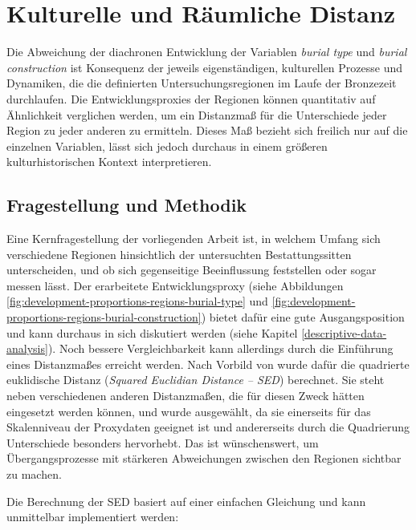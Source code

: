 \documentclass[openany,twoside,twocolumn]{book}
\begin{document}
\hypertarget{cultural-and-spatial-distance}{%
\section{Kulturelle und Räumliche
Distanz}\label{cultural-and-spatial-distance}}

Die Abweichung der diachronen Entwicklung der Variablen \emph{burial
type} und \emph{burial construction} ist Konsequenz der jeweils
eigenständigen, kulturellen Prozesse und Dynamiken, die die definierten
Untersuchungsregionen im Laufe der Bronzezeit durchlaufen. Die
Entwicklungsproxies der Regionen können quantitativ auf Ähnlichkeit
verglichen werden, um ein Distanzmaß für die Unterschiede jeder Region
zu jeder anderen zu ermitteln. Dieses Maß bezieht sich freilich nur auf
die einzelnen Variablen, lässt sich jedoch durchaus in einem größeren
kulturhistorischen Kontext interpretieren.

\hypertarget{fragestellung-und-methodik}{%
\subsection{Fragestellung und
Methodik}\label{fragestellung-und-methodik}}

Eine Kernfragestellung der vorliegenden Arbeit ist, in welchem Umfang
sich verschiedene Regionen hinsichtlich der untersuchten
Bestattungssitten unterscheiden, und ob sich gegenseitige Beeinflussung
feststellen oder sogar messen lässt. Der erarbeitete Entwicklungsproxy
(siehe Abbildungen \ref{fig:development-proportions-regions-burial-type}
und \ref{fig:development-proportions-regions-burial-construction})
bietet dafür eine gute Ausgangsposition und kann durchaus in sich
diskutiert werden (siehe Kapitel \ref{descriptive-data-analysis}). Noch
bessere Vergleichbarkeit kann allerdings durch die Einführung eines
Distanzmaßes erreicht werden. Nach Vorbild von
\textcite{neiman_stylistic_1995} wurde dafür die quadrierte euklidische
Distanz (\emph{Squared Euclidian Distance -- SED}) berechnet. Sie steht
neben verschiedenen anderen Distanzmaßen, die für diesen Zweck hätten
eingesetzt werden können, und wurde ausgewählt, da sie einerseits für
das Skalenniveau der Proxydaten geeignet ist und andererseits durch die
Quadrierung Unterschiede besonders hervorhebt. Das ist wünschenswert, um
Übergangsprozesse mit stärkeren Abweichungen zwischen den Regionen
sichtbar zu machen.

Die Berechnung der SED basiert auf einer einfachen Gleichung und kann
unmittelbar implementiert werden:
\end{document}
